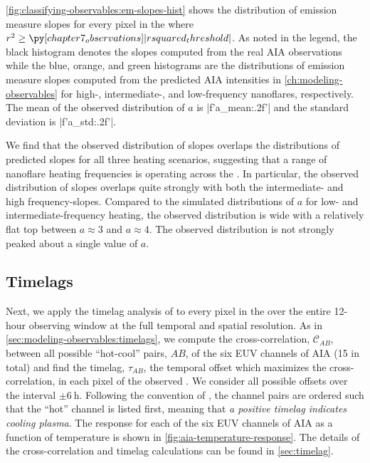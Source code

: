 \autoref{fig:classifying-observables:em-slopes-hist} shows the distribution of emission measure slopes for every pixel in the \AR{} where $r^2\ge\py[chapter7_observations]|rsquared_threshold|$. As noted in the legend, the black histogram denotes the slopes computed from the real AIA observations while the blue, orange, and green histograms are the distributions of emission measure slopes computed from the predicted AIA intensities in \autoref{ch:modeling-observables} for high-, intermediate-, and low-frequency nanoflares, respectively. The mean of the observed distribution of $a$ is |f'{a_mean:.2f}'| and the standard deviation is |f'{a_std:.2f}'|. 

We find that the observed distribution of slopes overlaps the distributions of predicted slopes for all three heating scenarios, suggesting that a range of nanoflare heating frequencies is operating across the \AR. In particular, the observed distribution of slopes overlaps quite strongly with both the intermediate- and high frequency-slopes. Compared to the simulated distributions of $a$ for low- and intermediate-frequency heating, the observed distribution is wide with a relatively flat top between $a\approx3$ and $a\approx4$. The observed distribution is not strongly peaked about a single value of $a$.

\subsection{Timelags}\label{sec:classifying-observables:timelags}

Next, we apply the timelag analysis of \citet{viall_evidence_2012} to every pixel in the \AR{} over the entire 12-hour observing window at the full temporal and spatial resolution. As in \autoref{sec:modeling-observables:timelags}, we compute the cross-correlation, $\mathcal{C}_{AB}$, between all possible ``hot-cool'' pairs, $AB$, of the six EUV channels of AIA (15 in total) and find the timelag, $\tau_{AB}$, the temporal offset which maximizes the cross-correlation, in each pixel of the observed \AR{}. We consider all possible offsets over the interval $\pm\SI{6}{\hour}$. Following the convention of \citet{viall_evidence_2012}, the channel pairs are ordered such that the ``hot'' channel is listed first, meaning that \textit{a positive timelag indicates cooling plasma}. The response for each of the six EUV channels of AIA as a function of temperature is shown in \autoref{fig:aia-temperature-response}. The details of the cross-correlation and timelag calculations can be found in \autoref{sec:timelag}.


